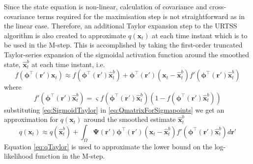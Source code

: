 \documentclass[]{article}
\begin{document}
Since the state equation is non-linear,  calculation of covariance and  cross-covariance terms required for the maximisation step is not straightforward as in the linear case. Therefore, an additional  Taylor expansion step to the URTSS algorithm is also created to approximate $q(\mathbf{x}_t)$ at each time instant which is to be used in the M-step. This is accomplished by taking the first-order truncated Taylor-series expansion of the sigmoidal activation function  around the smoothed state, $\hat{\mathbf x}_t^{b}$ at each time instant, i.e.
\begin{equation}\label{eq:SigmoidTaylor}
 f\left(\boldsymbol \phi^\top\left(\mathbf r'\right)\mathbf x_t\right) \approx f\left(\boldsymbol \phi^\top(\mathbf r')\hat{\mathbf x}_t^{b}\right)+  \boldsymbol \phi^\top\left(\mathbf r'\right)\left(\mathbf x_t - \hat{\mathbf x}_t^{b}\right)f'\left(\boldsymbol \phi^\top\left(\mathbf r'\right)\hat{\mathbf x}_t^{b}\right)
\end{equation}
where 
\begin{equation}\label{eq:SigmoidDerivative}
 f'\left(\boldsymbol \phi^\top\left(\mathbf r'\right)\hat{\mathbf x}_t^{b}\right)=\varsigma f\left(\boldsymbol \phi^\top\left(\mathbf r'\right)\hat{\mathbf x}_t^{b}\right)\left( 1-f\left( \boldsymbol \phi^\top\left(\mathbf r'\right)\hat{\mathbf x}_t^{b}\right)\right)
\end{equation}
substituting \ref{eq:SigmoidTaylor} in \ref{eq:QmatrixForSigmapoints}  we get an approximation for $q(\mathbf x_t)$ around the smoothed estimate $\hat{\mathbf{x}}_t^b$ 
\begin{equation}\label{eq:qTaylor}
 q(\mathbf x_t) \approx q\left(\hat{\mathbf x}_t^{b}\right)+\int_\Omega \boldsymbol{\Psi}\left(\mathbf{r}'\right)\boldsymbol \phi^\top\left(\mathbf r'\right) \left(\mathbf x_t -\hat{\mathbf x}_t^{b}\right)f'\left(\boldsymbol \phi^\top\left(\mathbf r'\right)\hat{\mathbf x}_t^{b}\right) d\mathbf{r}'
\end{equation}
Equation \ref{eq:qTaylor} is used to approximate the lower bound on the log-likelihood function in the M-step.
\end{document}
